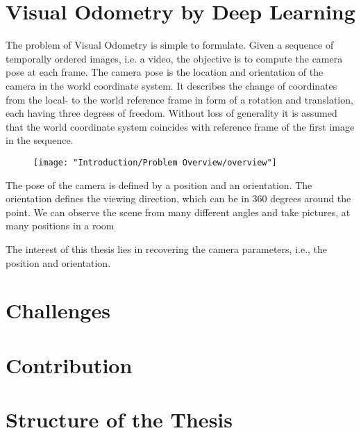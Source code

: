 		
		
		
		
		
		
		
	\section{Visual Odometry by Deep Learning}
		The problem of Visual Odometry is simple to formulate.
		Given a sequence of temporally ordered images, i.e. a video, the objective is to compute the camera pose at each frame.
		The camera pose is the location and orientation of the camera in the world coordinate system.
		It describes the change of coordinates from the local- to the world reference frame in form of a rotation and translation, each having three degrees of freedom.
		Without loss of generality it is assumed that the world coordinate system coincides with reference frame of the first image in the sequence.
		
		
		\begin{figure}
			\centering
			\texttt{[image: "Introduction/Problem Overview/overview"]}
			\caption{\label{fig:overview-visual-odometry}}
		\end{figure}
		
		
		The pose of the camera is defined by a position and an orientation.
		The orientation defines the viewing direction, which can be in 360 degrees around the point.
		We can observe the scene from many different angles and take pictures, at many positions in a room 
		
		The interest of this thesis lies in recovering the camera parameters, i.e., the position and orientation.
	
	
	\section{Challenges}
	
	\section{Contribution}
	
	\section{Structure of the Thesis}